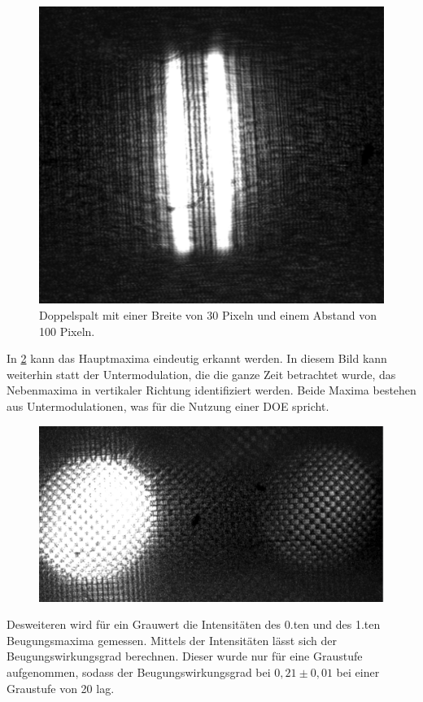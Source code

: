 \begin{figure}[h!]
	\centering
	\includegraphics[scale = 0.7]{doppelspalt.png}
	\caption{Doppelspalt mit einer Breite von 30 Pixeln und einem Abstand von 100 Pixeln.}
	\label{doppel}
\end{figure}

In \cref{gitter} kann das Hauptmaxima eindeutig erkannt werden. In diesem Bild kann weiterhin statt der Untermodulation, die die ganze Zeit betrachtet wurde, das Nebenmaxima in vertikaler Richtung identifiziert werden. Beide Maxima bestehen aus Untermodulationen, was für die Nutzung einer DOE spricht.
\begin{figure}[h!]
	\centering
	\includegraphics[scale = 0.7]{gitter.png}
	\caption{}
	\label{gitter}
\end{figure}
Desweiteren wird für ein Grauwert die Intensitäten des 0.ten und des 1.ten Beugungsmaxima gemessen. Mittels der Intensitäten lässt sich der Beugungswirkungsgrad berechnen. Dieser wurde nur für eine Graustufe aufgenommen, sodass der Beugungswirkungsgrad bei $0,21 \pm 0,01$ bei einer Graustufe von 20 lag.

